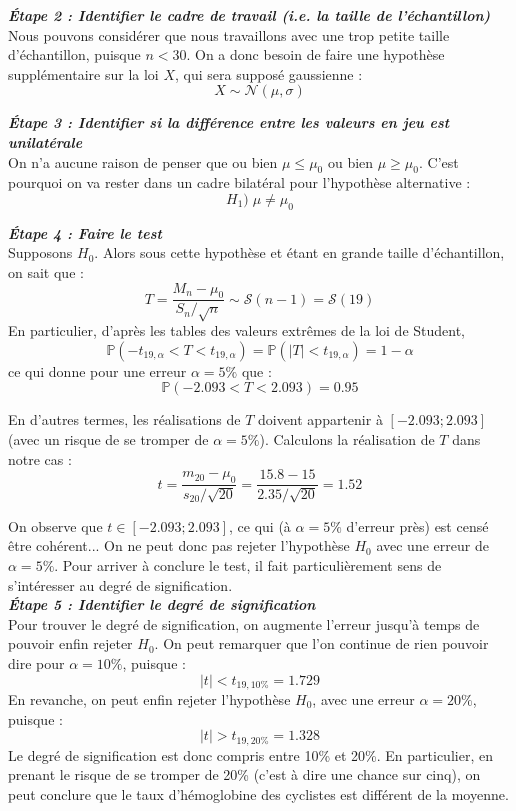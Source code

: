 \documentclass[a4paper,oneside,12pt]{article}
\theoremstyle{plain}
\def\P{{\mathbb P}}
\begin{document}
\textit{\textbf{Étape 2 : Identifier le cadre de travail (i.e. la taille de l'échantillon)}}\\
Nous pouvons considérer que nous travaillons avec une trop petite taille d'échantillon, puisque $n<30$. On a donc besoin de faire une hypothèse supplémentaire sur la loi $X$, qui sera supposé gaussienne :
$$X \sim \mathcal{N}(\mu, \sigma)$$
    
\textit{\textbf{Étape 3 : Identifier si la différence entre les valeurs en jeu est unilatérale}}\\
On n'a aucune raison de penser que ou bien $\mu\le \mu_0$ ou bien $\mu\ge \mu_0$. C'est pourquoi on va rester dans un cadre bilatéral pour l'hypothèse alternative : $$H_1) \;\mu \neq \mu_0$$
    
\textit{\textbf{Étape 4 : Faire le test}}\\
Supposons $H_0$. Alors sous cette hypothèse et étant en grande taille d'échantillon, on sait que :
$$ T = \frac{M_n-\mu_0}{S_n/\sqrt{n}} \sim \mathcal{S}(n-1)=\mathcal{S}(19)$$
En particulier, d'après les tables des valeurs extrêmes de la loi de Student, 
$$\P(-t_{19,\alpha}<T<t_{19,\alpha}) = \P(|T|<t_{19,\alpha}) = 1-\alpha$$
ce qui donne pour une erreur $\alpha = 5\%$ que :
$$\P(-2.093< T < 2.093) = 0.95$$
    
En d'autres termes, les réalisations de $T$ doivent appartenir à $[-2.093;2.093]$ (avec un risque de se tromper de $\alpha = 5\%$). Calculons la réalisation de $T$ dans notre cas :
$$ t = \frac{m_{20}-\mu_0}{s_{20}/\sqrt{20}} =  \frac{15.8-15}{2.35/\sqrt{20}} = 1.52$$
    
On observe que $t\in [-2.093;2.093]$, ce qui (à $\alpha = 5\%$ d'erreur près) est censé être cohérent... On ne peut donc pas rejeter l'hypothèse $H_0$ avec une erreur de $\alpha = 5\%$. Pour arriver à conclure le test, il fait particulièrement sens de s'intéresser au degré de signification.\\
    
\textit{\textbf{Étape 5 : Identifier le degré de signification}}\\
Pour trouver le degré de signification, on augmente l'erreur jusqu'à temps de pouvoir enfin rejeter $H_0$. On peut remarquer que l'on continue de rien pouvoir dire pour $\alpha = 10\%$, puisque :
$$|t|< t_{19,10\%} = 1.729$$
En revanche, on peut enfin rejeter l'hypothèse $H_0$, avec une erreur $\alpha = 20\%$, puisque :
$$|t|> t_{19,20\%} = 1.328$$
Le degré de signification est donc compris entre 10\% et 20\%. En particulier, en prenant le risque de se tromper de 20\% (c'est à dire une chance sur cinq), on peut conclure que le taux d'hémoglobine des cyclistes est différent de la moyenne.\\
\end{document}

